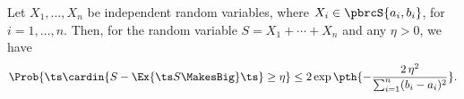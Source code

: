 \begin{theorem}
    Let $X_1, \dots, X_n$ be independent random variables, where $X_i
    \in \pbrcS{a_i, b_i}$, for $i=1,\ldots, n$.  Then, for the random
    variable $ S = X_1 + \cdots + X_n$ and any $\eta > 0$, we have
    \[
        \Prob{\ts \cardin{\Bigl. S - \Ex{\ts S\MakesBig } \ts } \geq
           \eta} \leq 2\exp \pth{ - \frac{2\,\eta^2}{\sum_{i=1}^n (b_i
              - a_i)^2} }.
    \]


\end{theorem}
